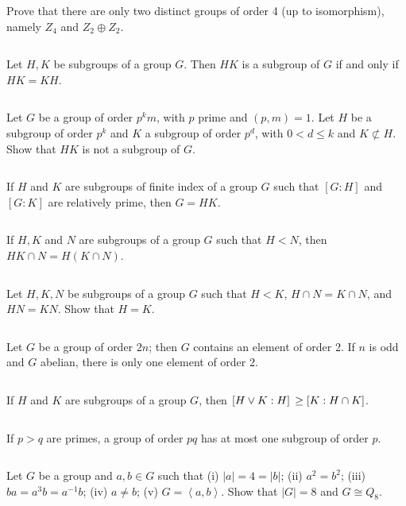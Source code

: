 \begin{ex}
    Prove that there are only two distinct groups of order 4 (up to isomorphism), namely $Z_{4}$ and $Z_{2}\oplus Z_{2}$.
\end{ex}

$$ $$

\begin{ex}
    Let $H,K$ be subgroups of a group $G$. Then $HK$ is a subgroup of $G$ if and only if $HK=KH$.
\end{ex}

$$ $$

\begin{ex}
    Let $G$ be a group of order $p^{k}m$, with $p$ prime and $(p,m)=1$. Let $H$ be a subgroup of order $p^{k}$ and $K$ a subgroup of order $p^{d}$, with $0<d\leq k$ and $K\not\subset H$. Show that $HK$ is not a subgroup of $G$.
\end{ex}

$$ $$

\begin{ex}
    If $H$ and $K$ are subgroups of finite index of a group $G$ such that $\left[G:H\right]$ and $\left[G:K\right]$ are relatively prime, then $G=HK$.
\end{ex}

$$ $$

\begin{ex}
    If $H,K$ and $N$ are subgroups of a group $G$ such that $H<N$, then $HK\cap N=H(K\cap N)$. 
\end{ex}

$$ $$

\begin{ex}
    Let $H,K,N$ be subgroups of a group $G$ such that $H<K$, $H\cap N=K\cap N$, and $HN=KN$. Show that $H=K$.
\end{ex}

$$ $$

\begin{ex}
    Let $G$ be a group of order $2n$; then $G$ contains an element of order 2. If $n$ is odd and $G$ abelian, there is only one element of order 2.
\end{ex}

$$ $$

\begin{ex}
    If $H$ and $K$ are subgroups of a group $G$, then $\left[H\vee K:H\right]\\\geq \left[K:H\cap K\right]$.
\end{ex}

$$ $$

\begin{ex}
    If $p>q$ are primes, a group of order $pq$ has at most one subgroup of order $p$.
\end{ex}

$$ $$

\begin{ex}
    Let $G$ be a group and $a,b\in G$ such that (i) $\left| a \right| =4=\left| b \right| $; (ii) $a^{2}=b^{2}$; (iii) $ba=a^{3}b=a^{-1}b$; (iv) $a\neq b$; (v) $G=\left\langle a,b\right\rangle$. Show that $\left| G \right| =8$ and $G\cong Q_{8}$.
\end{ex}